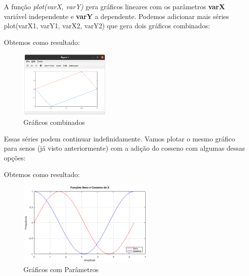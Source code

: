 \documentclass[a4paper,11pt]{article}
\begin{document}
A função \textit{plot(varX, varY)} gera gráficos lineares com os parâmetros \textbf{varX} variável independente e \textbf{varY} a dependente. Podemos adicionar mais séries plot(varX1, varY1, varX2, varY2) que gera dois gráficos combinados: \\

Obtemos como resultado:
\begin{figure}[H]
	\centering
	\includegraphics[width=0.4\textwidth]{imagem/grafico2}
	\caption{Gráficos combinados}
\end{figure}

Essas séries podem continuar indefinidamente. Vamos plotar o mesmo gráfico para senos (já visto anteriormente) com a adição do cosseno com algumas dessas opções: \\

Obtemos como resultado:
\begin{figure}[H]
	\centering
	\includegraphics[width=0.6\textwidth]{imagem/senoEcosseno}
	\caption{Gráficos com Parâmetros}
\end{figure}
\end{document}
